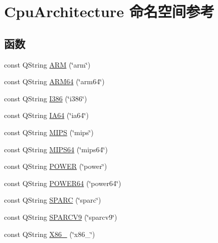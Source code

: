 \hypertarget{namespace_cpu_architecture}{}\section{Cpu\+Architecture 命名空间参考}
\label{namespace_cpu_architecture}
\subsection*{函数}
\begin{DoxyCompactItemize}
\item 
const Q\+String \mbox{\hyperlink{namespace_cpu_architecture_a5e4f57f020413467c72dad0735139567}{A\+RM}} (\char`\"{}arm\char`\"{})
\item 
const Q\+String \mbox{\hyperlink{namespace_cpu_architecture_a91aec293b3dc87c51123838d88986441}{A\+R\+M64}} (\char`\"{}arm64\char`\"{})
\item 
const Q\+String \mbox{\hyperlink{namespace_cpu_architecture_a8f5c143ce828bcc5dc3dfb0f890070cd}{I386}} (\char`\"{}i386\char`\"{})
\item 
const Q\+String \mbox{\hyperlink{namespace_cpu_architecture_a6e90e13c1d449f60a578738ede7e638f}{I\+A64}} (\char`\"{}ia64\char`\"{})
\item 
const Q\+String \mbox{\hyperlink{namespace_cpu_architecture_abdf3d30e94e980c990fa02fb6c8d73d1}{M\+I\+PS}} (\char`\"{}mips\char`\"{})
\item 
const Q\+String \mbox{\hyperlink{namespace_cpu_architecture_a23113174d9398d5ee88cc417b9e37eec}{M\+I\+P\+S64}} (\char`\"{}mips64\char`\"{})
\item 
const Q\+String \mbox{\hyperlink{namespace_cpu_architecture_af08284c5cac96a2fbdb8f3808f54baf0}{P\+O\+W\+ER}} (\char`\"{}power\char`\"{})
\item 
const Q\+String \mbox{\hyperlink{namespace_cpu_architecture_a0bcbffee69ca773f3fb3496d8e88d3fb}{P\+O\+W\+E\+R64}} (\char`\"{}power64\char`\"{})
\item 
const Q\+String \mbox{\hyperlink{namespace_cpu_architecture_ab83fedc2c0e28d43bb1f72ae8a0e4828}{S\+P\+A\+RC}} (\char`\"{}sparc\char`\"{})
\item 
const Q\+String \mbox{\hyperlink{namespace_cpu_architecture_a9032811867740215068d99cfa3f0b826}{S\+P\+A\+R\+C\+V9}} (\char`\"{}sparcv9\char`\"{})
\item 
const Q\+String \mbox{\hyperlink{namespace_cpu_architecture_a9c44b0608ff36a37484e1f77422c01ab}{X86\+\_}} (\char`\"{}x86\+\_\char`\"{})
\end{DoxyCompactItemize}



